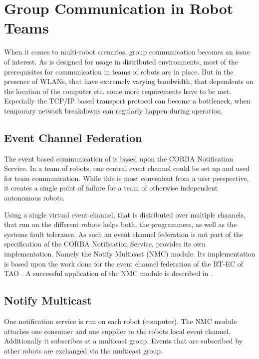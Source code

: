 \chapter{Group Communication in Robot Teams}
\label{sec:NMC}

When it comes to multi-robot scenarios, group communication becomes an
issue of interest. As \miro is designed for usage in distributed
environments, most of the prerequisites for communication in teams of
robots are in place. But in the presence of WLANs, that have extremely
varying bandwidth, that dependents on the location of the computer
etc. some more requirements have to be met. Especially the TCP/IP
based transport protocol can become a bottleneck, when temporary
network breakdowns can regularly happen during operation.

\section{Event Channel Federation}

The event based communication of \miro is based upon the CORBA
Notification Service. In a team of robots, one central event
channel could be set up and used for team communication. While this is
most convenient from a user perspective, it creates a single point of
failure for a team of otherwise independent autonomous robots.

Using a single virtual event channel, that is distributed over
multiple channels, that run on the different robots helps both, the
programmers, as well as the systems fault tolerance. As such an event
channel federation is not part of the specification of the CORBA
Notification Service, \miro provides its own implementation. Namely
the Notify Multicast (NMC) module. Its implementation is based upon
the work done for the event channel federation of the RT-EC of TAO
\cite{gore01designing}. A successful application of the NMC module is
described in \cite{Utz++:04:RCS}.

\section{Notify Multicast}

One notification service is run on each robot (computer). The NMC
module attaches one consumer and one supplier to the robots local
event channel. Additionally it subscribes at a multicast group. Events
that are subscribed by other robots are exchanged via the multicast
group.

